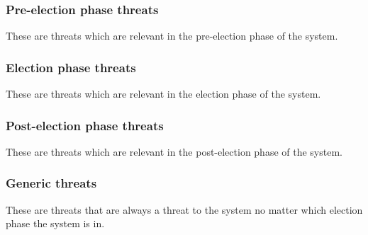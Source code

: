 \subsubsection{Pre-election phase threats}
These are threats which are relevant in the pre-election phase of the system.

\subsubsection{Election phase threats}
These are threats which are relevant in the election phase of the system.


\subsubsection{Post-election phase threats}
These are threats which are relevant in the post-election phase of the system.

\subsubsection{Generic threats}
These are threats that are always a threat to the system no matter which election phase the system is in.